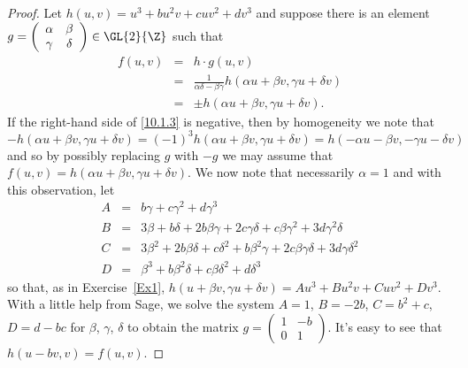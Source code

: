 \documentclass[10pt]{amsart}
\begin{document}
\begin{thm}[10 Points]
\begin{proof}
    Let $h(u,v) = u^3 + bu^2v + cuv^2 + dv^3$ and suppose there is an element $g = \left(\begin{array}{cc} \alpha & \beta\\ \gamma & \delta\end{array}\right) \in \GL{2}{\Z}$ such that 
      \begin{eqnarray}\label{10.1}
        f(u,v) &=& h \cdot g(u,v)\\
        &=& \frac{1}{\alpha\delta - \beta\gamma}h(\alpha u + \beta v, \gamma u + \delta v)\\ 
        &=& \pm h(\alpha u + \beta v, \gamma u + \delta v).\label{10.1.3}
      \end{eqnarray}
      If the right-hand side of \eqref{10.1.3} is negative, then by homogeneity we note that
      $$- h(\alpha u + \beta v, \gamma u + \delta v) = (-1)^3 h(\alpha u + \beta v, \gamma u + \delta v) = h(-\alpha u - \beta v, -\gamma u - \delta v)$$
      and so by possibly replacing $g$ with $-g$ we may assume that $f(u,v) = h(\alpha u + \beta v, \gamma u + \delta v)$.
      We now note that necessarily $\alpha = 1$ and with this observation, let 
      \begin{eqnarray*}
        A &=& b\gamma 
        + c \gamma^{2} 
        + d \gamma^{3}\\ 
        B &=& 3 \beta 
        + b \delta 
        + 2 b \beta \gamma 
        + 2 c \gamma \delta 
        + c \beta \gamma^{2} 
        + 3 d \gamma^{2} \delta\\
        C &=& 3 \beta^{2} 
        + 2 b \beta \delta 
        + c \delta^{2} 
        + b \beta^{2} \gamma 
        + 2 c \beta \gamma \delta
        + 3 d \gamma \delta^{2}\\
        D &=& \beta^{3} 
        + b \beta^{2} \delta 
        + c \beta \delta^{2} 
        + d \delta^{3}
      \end{eqnarray*}
      so that, as in Exercise~\ref{Ex1}, $h(u + \beta v, \gamma u + \delta v) = Au^3 + Bu^2v + Cuv^2 + Dv^3$.
      With a little help from Sage, we solve the system $A = 1$, $B = -2b$, $C = b^2 + c$, $D = d - bc$ for $\beta$, $\gamma$, $\delta$ to obtain the matrix $g = \left(\begin{array}{cc} 1 & -b\\ 0 & 1\end{array}\right)$.
        It's easy to see that $h(u - bv, v) = f(u,v)$.
  \end{proof}
\end{thm}
\end{document}
